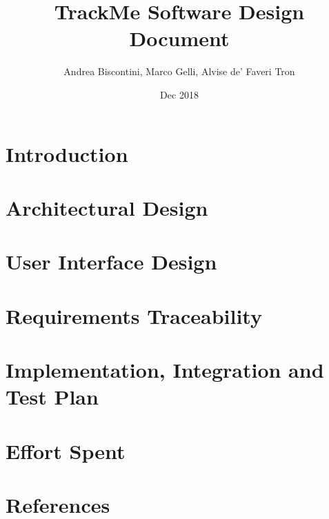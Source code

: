 \documentclass[12pt]{article}
\title{TrackMe Software Design Document}
\author{Andrea Biscontini, Marco Gelli, Alvise de' Faveri Tron}
\date{Dec 2018}
\begin{document}


\newpage

\tableofcontents

\section{Introduction}


\newpage

\section{Architectural Design}


\newpage

\section{User Interface Design}


\newpage

\section{Requirements Traceability}


\newpage

\section{Implementation, Integration and Test Plan}


\newpage

\section{Effort Spent}


\newpage

\section{References}

\end{document}
